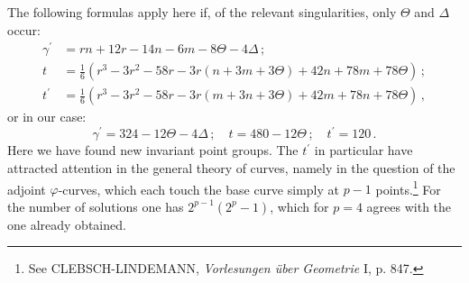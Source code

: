 \documentclass[leqno]{article}
\begin{document}
The following formulas apply here if, of the relevant singularities, only $\Theta$ and $\Delta$ occur:
\begin{align*}
	\gamma^\prime &= rn + 12r - 14n - 6m - 8\Theta - 4\Delta  \, ; \\
	t &= \frac{1}{6}\left(r^3 - 3r^2 - 58r - 3r \left(n + 3m + 3\Theta \right) +42n + 78m + 78\Theta \right) \, ; \\
	t^\prime &= \frac{1}{6} \left(r^3 - 3r^2 - 58r - 3r \left(m + 3n + 3\Theta \right)+42m + 78n + 78\Theta\right) \, , 
\end{align*}
or in our case:
\[
\gamma^\prime = 324 - 12\Theta - 4\Delta \, ; \quad t=480-12\Theta \, ; \quad t^\prime = 120 \, . 
\]
Here we have found new invariant point groups. The $ t^\prime $ in particular have attracted attention in the general theory of curves, namely in the question of the adjoint $ \varphi$-curves, which each touch the base curve simply at $ p-1 $ points.\footnote{See CLEBSCH-LINDEMANN, \textit{Vorlesungen \"uber Geometrie} I, p. 847.} For the number of solutions one has $ 2^{p-1} (2^p-1) $, which for $ p = 4 $ agrees with the one already obtained.
\end{document}
